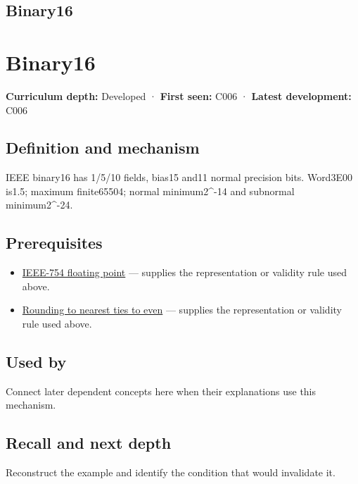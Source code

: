 \hypertarget{appendix-34443cec7170}{}
\section*{Binary16}
\chapter{Binary16}\label{appendix-34443cec7170-binary16}

\textbf{Curriculum depth:} Developed · \textbf{First seen:} C006 · \textbf{Latest development:} C006

\section{Definition and mechanism}\label{appendix-34443cec7170-definition-and-mechanism}

IEEE binary16 has 1/5/10 fields, bias15 and11 normal precision bits. Word3E00 is1.5; maximum finite65504; normal minimum2\^{}-14 and subnormal minimum2\^{}-24.

\section{Prerequisites}\label{appendix-34443cec7170-prerequisites}

\begin{itemize}
\tightlist
\item
  \hyperref[appendix-343615f49ddf]{IEEE-754 floating point} --- supplies the representation or validity rule used above.
\item
  \hyperref[appendix-614afe1de592]{Rounding to nearest ties to even} --- supplies the representation or validity rule used above.
\end{itemize}

\section{Used by}\label{appendix-34443cec7170-used-by}

Connect later dependent concepts here when their explanations use this mechanism.

\section{Recall and next depth}\label{appendix-34443cec7170-recall-and-next-depth}

Reconstruct the example and identify the condition that would invalidate it.

